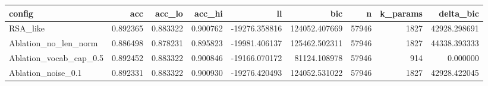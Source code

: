 \begin{tabular}{lrrrrrrrr}
\toprule
config & acc & acc\_lo & acc\_hi & ll & bic & n & k\_params & delta\_bic \\
\midrule
RSA\_like & 0.892365 & 0.883322 & 0.900762 & -19276.358816 & 124052.407669 & 57946 & 1827 & 42928.298691 \\
Ablation\_no\_len\_norm & 0.886498 & 0.878231 & 0.895823 & -19981.406137 & 125462.502311 & 57946 & 1827 & 44338.393333 \\
Ablation\_vocab\_cap\_0.5 & 0.892452 & 0.883322 & 0.900846 & -19166.070172 & 81124.108978 & 57946 & 914 & 0.000000 \\
Ablation\_noise\_0.1 & 0.892331 & 0.883322 & 0.900930 & -19276.420493 & 124052.531022 & 57946 & 1827 & 42928.422045 \\
\bottomrule
\end{tabular}
